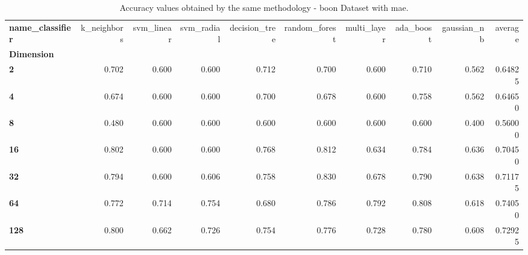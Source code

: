 \begin{table}
\centering
\caption{Accuracy values obtained by the same methodology - boon Dataset with mae.}
\label{accuracy_boon_mae-reproduction}
\begin{tabular}{lrrrrrrrrr}
\toprule
\textbf{name\_classifier} &  k\_neighbors &  svm\_linear &  svm\_radial &  decision\_tree &  random\_forest &  multi\_layer &  ada\_boost &  gaussian\_nb &  average \\
\textbf{Dimension} &              &             &             &                &                &              &            &              &          \\
\midrule
\textbf{2        } &        0.702 &       0.600 &       0.600 &          0.712 &          0.700 &        0.600 &      0.710 &        0.562 &  0.64825 \\
\textbf{4        } &        0.674 &       0.600 &       0.600 &          0.700 &          0.678 &        0.600 &      0.758 &        0.562 &  0.64650 \\
\textbf{8        } &        0.480 &       0.600 &       0.600 &          0.600 &          0.600 &        0.600 &      0.600 &        0.400 &  0.56000 \\
\textbf{16       } &        0.802 &       0.600 &       0.600 &          0.768 &          0.812 &        0.634 &      0.784 &        0.636 &  0.70450 \\
\textbf{32       } &        0.794 &       0.600 &       0.606 &          0.758 &          0.830 &        0.678 &      0.790 &        0.638 &  0.71175 \\
\textbf{64       } &        0.772 &       0.714 &       0.754 &          0.680 &          0.786 &        0.792 &      0.808 &        0.618 &  0.74050 \\
\textbf{128      } &        0.800 &       0.662 &       0.726 &          0.754 &          0.776 &        0.728 &      0.780 &        0.608 &  0.72925 \\
\bottomrule
\end{tabular}
\end{table}
